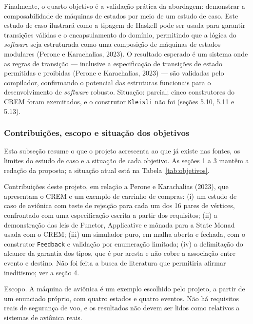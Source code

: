 \documentclass[12pt,a4paper]{article}
\begin{document}
Finalmente, o quarto objetivo é a validação prática da abordagem: demonstrar a composabilidade de máquinas de estados por meio de um estudo de caso. Este estudo de caso ilustrará como a tipagem de Haskell pode ser usada para garantir transições válidas e o encapsulamento do domínio, permitindo que a lógica do \textit{software} seja estruturada como uma composição de máquinas de estados modulares (Perone e Karachalias, 2023). O resultado esperado é um sistema onde as regras de transição --- inclusive a especificação de transições de estado permitidas e proibidas (Perone e Karachalias, 2023) --- são validadas pelo compilador, confirmando o potencial das estruturas funcionais para o desenvolvimento de \textit{software} robusto. Situação: parcial; cinco construtores do CREM foram exercitados, e o construtor \texttt{Kleisli} não foi (seções 5.10, 5.11 e 5.13).


\subsubsection{Contribuições, escopo e situação dos objetivos}

Esta subseção resume o que o projeto acrescenta ao que já existe nas fontes, os limites do estudo de caso e a situação de cada objetivo. As seções 1 a 3 mantêm a redação da proposta; a situação atual está na Tabela~\ref{tab:objetivos}.

Contribuições deste projeto, em relação a Perone e Karachalias (2023), que apresentam o CREM e um exemplo de carrinho de compras: (i) um estudo de caso de aviônica com teste de rejeição para cada um dos 16 pares de vértices, confrontado com uma especificação escrita a partir dos requisitos; (ii) a demonstração das leis de Functor, Applicative e mônada para a State Monad usada com o CREM; (iii) um simulador puro, em malha aberta e fechada, com o construtor \texttt{Feedback} e validação por enumeração limitada; (iv) a delimitação do alcance da garantia dos tipos, que é por aresta e não cobre a associação entre evento e destino. Não foi feita a busca de literatura que permitiria afirmar ineditismo; ver a seção 4.

Escopo. A máquina de aviônica é um exemplo escolhido pelo projeto, a partir de um enunciado próprio, com quatro estados e quatro eventos. Não há requisitos reais de segurança de voo, e os resultados não devem ser lidos como relativos a sistemas de aviônica reais.
\end{document}
